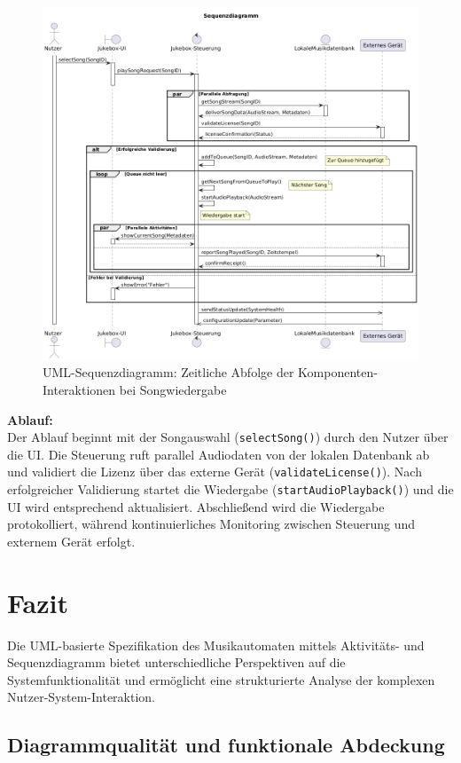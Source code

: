 \documentclass[12pt,oneside]{article}
\begin{document}
\begin{figure}[H]
    \centering
    \includegraphics[width=\textwidth]{images/sequence_diagram.png}
    \caption{UML-Sequenzdiagramm: Zeitliche Abfolge der Komponenten-Interaktionen bei Songwiedergabe}
    \label{fig:sequence_diagram}
\end{figure}
\noindent
\textbf{Ablauf:}\\
Der Ablauf beginnt mit der Songauswahl (\texttt{selectSong()}) durch den Nutzer über die UI. Die Steuerung ruft parallel Audiodaten von der lokalen Datenbank ab und validiert die Lizenz über das externe Gerät (\texttt{validateLicense()}). Nach erfolgreicher Validierung startet die Wiedergabe (\texttt{startAudioPlayback()}) und die UI wird entsprechend aktualisiert. Abschließend wird die Wiedergabe protokolliert, während kontinuierliches Monitoring zwischen Steuerung und externem Gerät erfolgt.

\section{Fazit} \label{sec:fazit}

Die UML-basierte Spezifikation des Musikautomaten mittels Aktivitäts- und Sequenzdiagramm bietet unterschiedliche Perspektiven auf die Systemfunktionalität und ermöglicht eine strukturierte Analyse der komplexen Nutzer-System-Interaktion.

\subsection{Diagrammqualität und funktionale Abdeckung}
\end{document}
